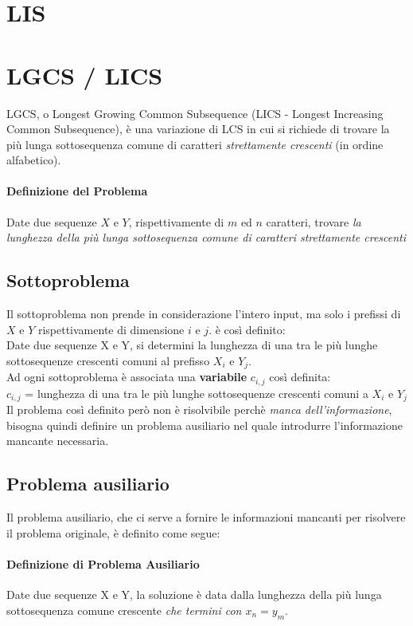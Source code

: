 \documentclass[12pt, a4paper, openany]{book}
\begin{document}
\section{LIS}
\section{LGCS / LICS} %
LGCS, o Longest Growing Common Subsequence (LICS - Longest Increasing Common Subsequence), è una variazione di LCS in cui si richiede
di trovare la più lunga sottosequenza comune di caratteri \emph{strettamente crescenti} (in ordine alfabetico).

\paragraph*{Definizione del Problema} 
Date due sequenze $X$ e $Y$, rispettivamente di $m$ ed $n$ caratteri, trovare \emph{la lunghezza della più lunga sottosequenza comune di caratteri strettamente crescenti}

\subsection*{Sottoproblema}
Il sottoproblema non prende in considerazione l'intero input, ma solo i prefissi di $X$ e $Y$ rispettivamente di dimensione $i$ e $j$.
è così definito: 
\\Date due sequenze X e Y, si determini la lunghezza di una tra le più lunghe sottosequenze crescenti comuni al prefisso $X_i$ e $Y_j$.
\\Ad ogni sottoproblema è associata una \textbf{variabile} $c_{i,j}$ così definita:
\\$c_{i,j}$ = lunghezza di una tra le più lunghe sottosequenze crescenti comuni a $X_i$ e $Y_j$
\\Il problema così definito però non è risolvibile perchè \emph{manca dell'informazione}, bisogna quindi definire un problema ausiliario nel quale introdurre l'informazione mancante necessaria.

\subsection*{Problema ausiliario}
Il problema ausiliario, che ci serve a fornire le informazioni mancanti per risolvere il problema originale, è definito come segue:

\paragraph*{Definizione di Problema Ausiliario}
Date due sequenze X e Y, la soluzione è data dalla lunghezza della più lunga sottosequenza comune crescente \emph{che termini con $x_n =y_m$}.
\end{document}
